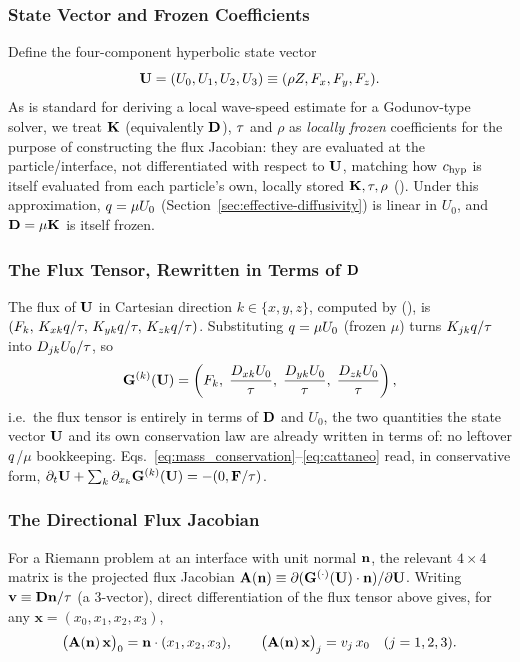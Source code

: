 \subsubsection{State Vector and Frozen Coefficients}
Define the four-component hyperbolic state vector
\begin{equation}
  \mathbf{U} = (U_0, U_1, U_2, U_3) \equiv (\rho Z, F_x, F_y, F_z) .
\end{equation}
As is standard for deriving a local wave-speed estimate for a Godunov-type
solver, we treat $\mathbf{K}$ (equivalently $\mathbf{D}$), $\tau$ and $\rho$
as \emph{locally frozen} coefficients for the purpose of constructing the
flux Jacobian: they are evaluated at the particle/interface, not
differentiated with respect to $\mathbf{U}$, matching how $c_{\rm hyp}$ is itself
evaluated from each particle's own, locally stored $\mathbf{K},\tau,\rho$
(). Under this approximation,
$q=\mu U_0$ (Section~\ref{sec:effective-diffusivity})
is linear in $U_0$, and $\mathbf{D}=\mu\mathbf{K}$ is itself frozen.

\subsubsection{The Flux Tensor, Rewritten in Terms of $\mathbf{D}$}
The flux of $\mathbf{U}$ in Cartesian direction $k\in\{x,y,z\}$, computed by
(), is $(F_k,\,K_{xk}q/\tau,\,
K_{yk}q/\tau,\,K_{zk}q/\tau)$. Substituting
$q=\mu U_0$ (frozen $\mu$) turns
$K_{jk}q/\tau$ into $D_{jk}U_0/\tau$, so
\begin{equation}
  \mathbf{G}^{(k)}(\mathbf{U}) = \left( F_k, \; \frac{D_{xk}U_0}{\tau}, \; \frac{D_{yk}U_0}{\tau}, \; \frac{D_{zk}U_0}{\tau} \right) ,
\end{equation}
i.e.\ the flux tensor is entirely in terms of $\mathbf{D}$ and $U_0$, the two
quantities the state vector $\mathbf{U}$ and its own conservation law are
already written in terms of: no leftover $q$/$\mu$ bookkeeping.
Eqs.~\eqref{eq:mass_conservation}--\eqref{eq:cattaneo} read, in
conservative form, $\partial_t\mathbf{U} + \sum_k \partial_{x_k}\mathbf{G}^{(k)}(\mathbf{U})
= -(0,\mathbf{F}/\tau)$.

\subsubsection{The Directional Flux Jacobian}
For a Riemann problem at an interface with unit normal $\mathbf{n}$, the
relevant $4\times4$ matrix is the projected flux Jacobian
$\mathbf A(\mathbf{n}) \equiv \partial(\mathbf{G}^{(\cdot)}(\mathbf{U})\cdot\mathbf{n})/\partial\mathbf{U}$.
Writing $\mathbf v \equiv \mathbf{D}\mathbf{n}/\tau$ (a 3-vector), direct
differentiation of the flux tensor above gives, for any $\mathbf x =
(x_0,x_1,x_2,x_3)$,
\begin{equation}
  \label{eq:jacobian_action}
  \big(\mathbf A(\mathbf{n})\,\mathbf x\big)_0 = \mathbf{n}\cdot(x_1,x_2,x_3) ,
  \qquad
  \big(\mathbf A(\mathbf{n})\,\mathbf x\big)_j = v_j\, x_0 \quad (j=1,2,3) .
\end{equation}

